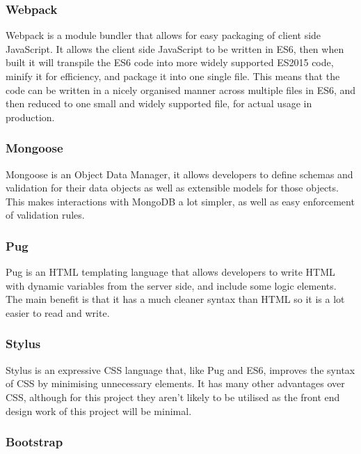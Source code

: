     \subsubsection*{Webpack}
    
    Webpack is a module bundler that allows for easy packaging of client side JavaScript. It allows the client side JavaScript to be written in ES6, then when built it will transpile the ES6 code into more widely supported ES2015 code, minify it for efficiency, and package it into one single file. This means that the code can be written in a nicely organised manner across multiple files in ES6, and then reduced to one small and widely supported file, for actual usage in production.

    \subsubsection*{Mongoose}

    Mongoose is an Object Data Manager, it allows developers to define schemas and validation for their data objects as well as extensible models for those objects. This makes interactions with MongoDB a lot simpler, as well as easy enforcement of validation rules.

    \subsubsection*{Pug}

    Pug is an HTML templating language that allows developers to write HTML with dynamic variables from the server side, and include some logic elements. The main benefit is that it has a much cleaner syntax than HTML so it is a lot easier to read and write. 

    \subsubsection*{Stylus}

    Stylus is an expressive CSS language that, like Pug and ES6, improves the syntax of CSS by minimising unnecessary elements. It has many other advantages over CSS, although for this project they aren't likely to be utilised as the front end design work of this project will be minimal. 

    \subsubsection*{Bootstrap}


